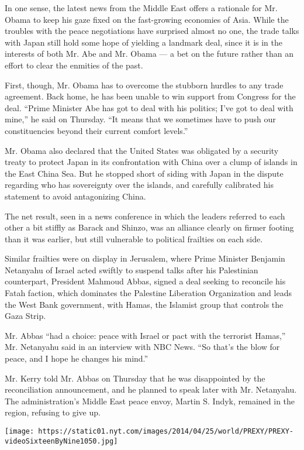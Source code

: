 In one sense, the latest news from the Middle East offers a rationale
for Mr. Obama to keep his gaze fixed on the fast-growing economies of
Asia. While the troubles with the peace negotiations have surprised
almost no one, the trade talks with Japan still hold some hope of
yielding a landmark deal, since it is in the interests of both Mr. Abe
and Mr. Obama --- a bet on the future rather than an effort to clear the
enmities of the past.

First, though, Mr. Obama has to overcome the stubborn hurdles to any
trade agreement. Back home, he has been unable to win support from
Congress for the deal. ``Prime Minister Abe has got to deal with his
politics; I've got to deal with mine,'' he said on Thursday. ``It means
that we sometimes have to push our constituencies beyond their current
comfort levels.''

Mr. Obama also declared that the United States was obligated by a
security treaty to protect Japan in its confrontation with China over a
clump of islands in the East China Sea. But he stopped short of siding
with Japan in the dispute regarding who has sovereignty over the
islands, and carefully calibrated his statement to avoid antagonizing
China.

The net result, seen in a news conference in which the leaders referred
to each other a bit stiffly as Barack and Shinzo, was an alliance
clearly on firmer footing than it was earlier, but still vulnerable to
political frailties on each side.

Similar frailties were on display in Jerusalem, where Prime Minister
Benjamin Netanyahu of Israel acted swiftly to suspend talks after his
Palestinian counterpart, President Mahmoud Abbas, signed a deal seeking
to reconcile his Fatah faction, which dominates the Palestine Liberation
Organization and leads the West Bank government, with Hamas, the
Islamist group that controls the Gaza Strip.

Mr. Abbas ``had a choice: peace with Israel or pact with the terrorist
Hamas,'' Mr. Netanyahu said in an interview with NBC News. ``So that's
the blow for peace, and I hope he changes his mind.''

Mr. Kerry told Mr. Abbas on Thursday that he was disappointed by the
reconciliation announcement, and he planned to speak later with Mr.
Netanyahu. The administration's Middle East peace envoy, Martin S.
Indyk, remained in the region, refusing to give up.

\texttt{[image: https://static01.nyt.com/images/2014/04/25/world/PREXY/PREXY-videoSixteenByNine1050.jpg]}

